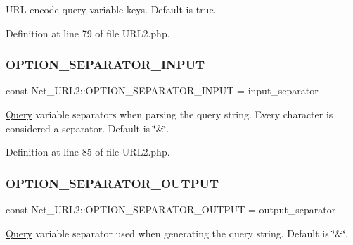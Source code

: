 U\+R\+L-\/encode query variable keys. Default is true. 

Definition at line 79 of file U\+R\+L2.\+php.

\hypertarget{classNet__URL2_af5b6f766fae9600b3938e33c32893bce}{}\label{classNet__URL2_af5b6f766fae9600b3938e33c32893bce} 
\subsubsection{\texorpdfstring{O\+P\+T\+I\+O\+N\+\_\+\+S\+E\+P\+A\+R\+A\+T\+O\+R\+\_\+\+I\+N\+P\+UT}{OPTION\_SEPARATOR\_INPUT}}
{\footnotesize\ttfamily const Net\+\_\+\+U\+R\+L2\+::\+O\+P\+T\+I\+O\+N\+\_\+\+S\+E\+P\+A\+R\+A\+T\+O\+R\+\_\+\+I\+N\+P\+UT = \textquotesingle{}input\+\_\+separator\textquotesingle{}}

\hyperlink{classQuery}{Query} variable separators when parsing the query string. Every character is considered a separator. Default is \char`\"{}\&\char`\"{}. 

Definition at line 85 of file U\+R\+L2.\+php.

\hypertarget{classNet__URL2_a84719f522747f51638a9c8474d4abc39}{}\label{classNet__URL2_a84719f522747f51638a9c8474d4abc39} 
\subsubsection{\texorpdfstring{O\+P\+T\+I\+O\+N\+\_\+\+S\+E\+P\+A\+R\+A\+T\+O\+R\+\_\+\+O\+U\+T\+P\+UT}{OPTION\_SEPARATOR\_OUTPUT}}
{\footnotesize\ttfamily const Net\+\_\+\+U\+R\+L2\+::\+O\+P\+T\+I\+O\+N\+\_\+\+S\+E\+P\+A\+R\+A\+T\+O\+R\+\_\+\+O\+U\+T\+P\+UT = \textquotesingle{}output\+\_\+separator\textquotesingle{}}

\hyperlink{classQuery}{Query} variable separator used when generating the query string. Default is \char`\"{}\&\char`\"{}. 

